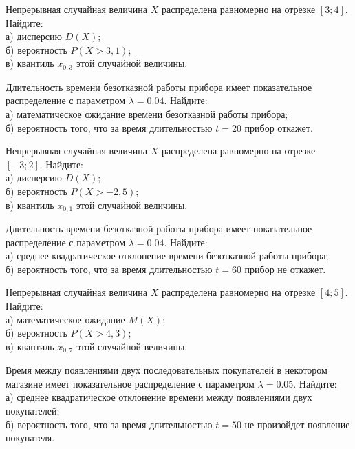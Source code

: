 \vfill

\newpage\setcounter{zad}{0}

\z Непрерывная случайная величина $X$ распределена равномерно на отрезке $[3; 4]$. Найдите: \\ \quad а) дисперсию $D(X)$; \\ \quad б) вероятность $P(X>3{,}1)$; \\ \quad в) квантиль $x_{0{,}3}$ этой случайной величины.


\vfill

\z Длительность времени безотказной работы прибора имеет показательное распределение с параметром $\lambda = 0.04$. Найдите: \\ \quad а) математическое ожидание времени безотказной работы прибора; \\ \quad б) вероятность того, что за время длительностью $t = 20$ прибор  откажет.
 

\vfill

\newpage\setcounter{zad}{0}

\z Непрерывная случайная величина $X$ распределена равномерно на отрезке $[-3; 2]$. Найдите: \\ \quad а) дисперсию $D(X)$; \\ \quad б) вероятность $P(X>-2{,}5)$; \\ \quad в) квантиль $x_{0{,}1}$ этой случайной величины.


\vfill

\z Длительность времени безотказной работы прибора имеет показательное распределение с параметром $\lambda = 0.04$. Найдите: \\ \quad а) среднее квадратическое отклонение времени безотказной работы прибора; \\ \quad б) вероятность того, что за время длительностью $t = 60$ прибор не откажет.
 

\vfill

\newpage\setcounter{zad}{0}

\z Непрерывная случайная величина $X$ распределена равномерно на отрезке $[4; 5]$. Найдите: \\ \quad а) математическое ожидание $M(X)$; \\ \quad б) вероятность $P(X>4{,}3)$; \\ \quad в) квантиль $x_{0{,}7}$ этой случайной величины.


\vfill

\z Время между появлениями двух последовательных покупателей в некотором магазине имеет показательное распределение с параметром $\lambda = 0.05$. Найдите: \\ \quad а) среднее квадратическое отклонение времени между появлениями двух покупателей; \\ \quad б) вероятность того, что за время длительностью $t = 50$ не произойдет появление покупателя.
 

